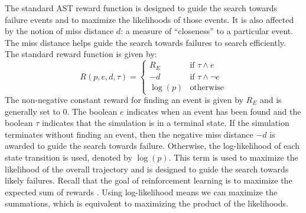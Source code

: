 The standard AST reward function is designed to guide the search towards failure events and to maximize the likelihoods of those events. It is also affected by the notion of miss distance $d$: a measure of ``closeness'' to a particular event. The miss distance helps guide the search towards failures to search efficiently. The standard reward function is given by:
\begin{equation}\label{eq:standard_reward}
  R(p,e,d,\tau)=\begin{cases} 
      R_E & \text{if } \tau \wedge e \\
      -d & \text{if } \tau \wedge \neg e\\
      \log(p) & \text{otherwise}
  \end{cases}
\end{equation}
The non-negative constant reward for finding an event is given by $R_E$ and is generally set to $0$.
The boolean $e$ indicates when an event has been found and the boolean $\tau$ indicates that the simulation is in a terminal state.
If the simulation terminates without finding an event, then the negative miss distance $-d$ is awarded to guide the search towards failure.
Otherwise, the log-likelihood of each state transition is used, denoted by $\log(p)$.
This term is used to maximize the likelihood of the overall trajectory and is designed to guide the search towards likely failures.
Recall that the goal of reinforcement learning is to maximize the expected sum of rewards \cite{sutton2018reinforcement}.
Using log-likelihood means we can maximize the summations, which is equivalent to maximizing the product of the likelihoods.




